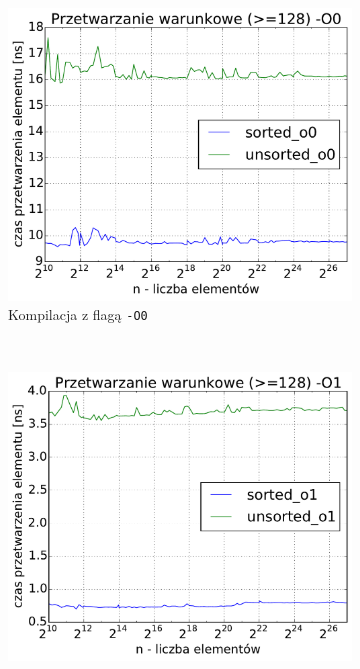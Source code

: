 \begin{figure}[!h]
    \centering
    \begin{subfigure}[c]{0.45\textwidth}
        \centering
        \includegraphics[width=\textwidth]{images/benchs_xeon/filtered_sum_O0}
        \caption{Kompilacja z flagą \texttt{-O0}}
    \end{subfigure}
    ~
    \begin{subfigure}[c]{0.45\textwidth}
        \centering
        \includegraphics[width=\textwidth]{images/benchs_xeon/filtered_sum_O1}

\end{subfigure}
\end{figure}
